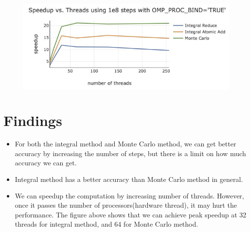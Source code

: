 \documentclass[a4paper,11pt,BCOR10mm,oneside,headsepline]{scrartcl}
\begin{document}
		\begin{figure}[!htbp]
			\centering
			\includegraphics[scale=0.6]{plot}
		\end{figure}

	\section{Findings}
	\begin{itemize}
		\item For both the integral method and Monte Carlo method, we can get better accuracy by increasing the number of steps, but there is a limit on how much accuracy we can get.
		\item Integral method has a better accuracy than Monte Carlo method in general.
		\item We can speedup the computation by increasing number of threads. However, once it passes the number of processors(hardware thread), it may hurt the performance. The figure above shows that we can achieve peak speedup at 32 threads for integral method, and 64 for Monte Carlo method.
	\end{itemize}
\end{document}

